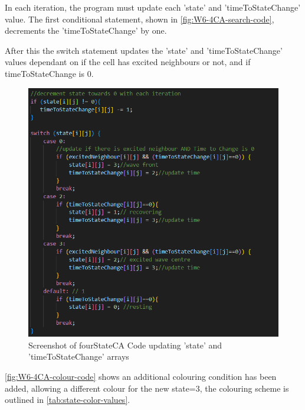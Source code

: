 In each iteration, the program must update each 'state' and 'timeToStateChange' value. The first conditional statement, shown in \autoref{fig:W6-4CA-search-code}, decrements the 'timeToStateChange' by one. 

After this the switch statement updates the 'state' and 'timeToStateChange' values dependant on if the cell has excited neighbours or not, and if timeToStateChange is 0.  

\begin{figure}[H] 
    \centering
    \includegraphics[width=1\columnwidth]{Figures/Week 6/4stateCA-update-code.png}
    \caption{Screenshot of fourStateCA Code updating 'state' and 'timeToStateChange' arrays}
    \label{fig:W6-4CA-update-code}
\end{figure}


\autoref{fig:W6-4CA-colour-code} shows an additional colouring condition has been added, allowing a different colour for the new state=3, the colouring scheme is outlined in \autoref{tab:state-color-values}.  

